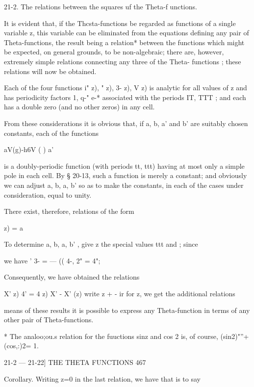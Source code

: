 21-2. The relations between the squares uf the Theta-f unctions.

It is evident that, if the Thcsta-functions be regarded as functions
of a single variable z, this variable can be eliminated from the
equations defining any pair of Theta-functions, the result being a
relation* between the functions which might be expected, on general
grounds, to be non-algebraic; there are, however, extremely simple
relations connecting any three of the Theta- functions ; these
relations will now be obtained.

Each of the four functions i" z), " z), 3- z), V z) is analytic for
all values of z and has periodicity factors 1, q-" e-* associated with
the periods IT, TTT ; and each has a double zero (and no other zeros)
in any cell.

From these considerations it is obvious that, if a, b, a' and b' are
suitably chosen constants, each of the functions

aV(g)-h6V ( ) a'%

is a doubly-periodic function (with periods tt, ttt) having at most
only a simple pole in each cell. By § 20-13, such a function is merely
a constant; and obviously we can adjust a, b, a, b' so as to make the
constants, in each of the cases under consideration, equal to unity.

There exist, therefore, relations of the form

     z) = a%

To determine a, b, a, b' , give z the special values ttt and ; since

we have ' 3- = — (( 4-, 2" = 4"; %

Consequently, we have obtained the relations

X' z) 4' = 4 z) X' - X' (z) %
write z + - ir for z, we get the additional relations

means of these results it is possible to express any Theta-function in
terms of any other pair of Theta-functions.

* The analoo;ou.s relation for the fuuctions sinz and cos 2 is, of
course, (sin2)"''+(cos,:)2= 1.



21-2 — 21-22] THE THETA FUNCTIONS 467

Corollary. Writing z=0 in the last relation, we have that is to say

